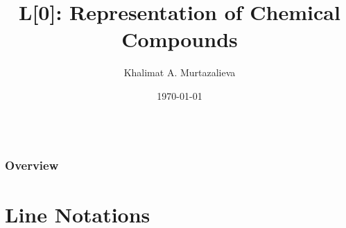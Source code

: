 \documentclass{beamer}
\title{L[0]: Representation of Chemical Compounds} %
\author{Khalimat A. Murtazalieva} %
\institute[MIPT] %
{
Fundamentals of Cheminformatics \\ %
\medskip
\textit{@khalimat} %
}
\date{\today} %
\begin{document}
{
\begin{frame}
\begin{columns}
    \begin{column}{0.90\textwidth}
        \titlepage
    \end{column}
\end{columns}


\begin{figure}[b]
\end{figure}

\end{frame}
}

\begin{frame}
\frametitle{Overview} %
\tableofcontents %
\end{frame}


\section{Line Notations} %
\end{document}
